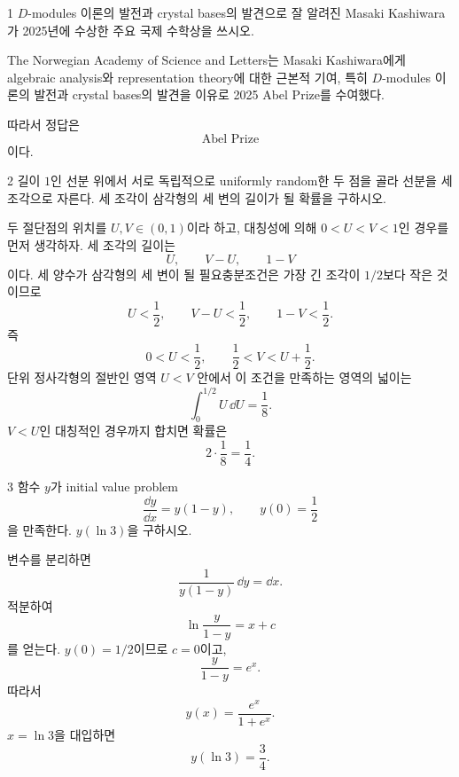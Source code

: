 
\begin{problem}{1}
$D$-modules 이론의 발전과 crystal bases의 발견으로 잘 알려진 Masaki Kashiwara가 2025년에 수상한 주요 국제 수학상을 쓰시오.
\end{problem}

\begin{solution}
The Norwegian Academy of Science and Letters는 Masaki Kashiwara에게 algebraic analysis와 representation theory에 대한 근본적 기여, 특히 $D$-modules 이론의 발전과 crystal bases의 발견을 이유로 2025 Abel Prize를 수여했다.

따라서 정답은
\[
    \boxed{\text{Abel Prize}}
\]
이다.
\end{solution}

\begin{problem}{2}
길이 $1$인 선분 위에서 서로 독립적으로 uniformly random한 두 점을 골라 선분을 세 조각으로 자른다. 세 조각이 삼각형의 세 변의 길이가 될 확률을 구하시오.
\end{problem}

\begin{solution}
두 절단점의 위치를 $U,V\in(0,1)$이라 하고, 대칭성에 의해 $0<U<V<1$인 경우를 먼저 생각하자. 세 조각의 길이는
\[
    U,
    \qquad
    V-U,
    \qquad
    1-V
\]
이다. 세 양수가 삼각형의 세 변이 될 필요충분조건은 가장 긴 조각이 $1/2$보다 작은 것이므로
\[
    U<\frac12,
    \qquad
    V-U<\frac12,
    \qquad
    1-V<\frac12.
\]
즉
\[
    0<U<\frac12,
    \qquad
    \frac12<V<U+\frac12.
\]
단위 정사각형의 절반인 영역 $U<V$ 안에서 이 조건을 만족하는 영역의 넓이는
\[
    \int_0^{1/2}U\,\dd U
    =\frac18.
\]
$V<U$인 대칭적인 경우까지 합치면 확률은
\[
    2\cdot\frac18
    =\boxed{\frac14}.
\]
\end{solution}

\begin{problem}{3}
함수 $y$가 initial value problem
\[
    \frac{\dd y}{\dd x}=y(1-y),
    \qquad
    y(0)=\frac12
\]
을 만족한다. $y(\ln 3)$을 구하시오.
\end{problem}

\begin{solution}
변수를 분리하면
\[
    \frac{1}{y(1-y)}\,\dd y
    =\dd x.
\]
적분하여
\[
    \ln\frac{y}{1-y}=x+c
\]
를 얻는다. $y(0)=1/2$이므로 $c=0$이고,
\[
    \frac{y}{1-y}=e^x.
\]
따라서
\[
    y(x)=\frac{e^x}{1+e^x}.
\]
$x=\ln3$을 대입하면
\[
    \boxed{y(\ln3)=\frac34}.
\]
\end{solution}

